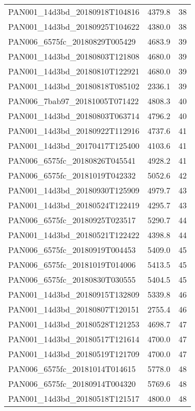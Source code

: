 \begin{tabular}{lrr}
PAN001\_14d3bd\_20180918T104816 &     4379.8 &       38 \\
PAN001\_14d3bd\_20180925T104622 &     4380.0 &       38 \\
PAN006\_6575fc\_20180829T005429 &     4683.9 &       39 \\
PAN001\_14d3bd\_20180803T121808 &     4680.0 &       39 \\
PAN001\_14d3bd\_20180810T122921 &     4680.0 &       39 \\
PAN001\_14d3bd\_20180818T085102 &     2336.1 &       39 \\
PAN006\_7bab97\_20181005T071422 &     4808.3 &       40 \\
PAN001\_14d3bd\_20180803T063714 &     4796.2 &       40 \\
PAN001\_14d3bd\_20180922T112916 &     4737.6 &       41 \\
PAN001\_14d3bd\_20170417T125400 &     4103.6 &       41 \\
PAN006\_6575fc\_20180826T045541 &     4928.2 &       41 \\
PAN006\_6575fc\_20181019T042332 &     5052.6 &       42 \\
PAN001\_14d3bd\_20180930T125909 &     4979.7 &       43 \\
PAN001\_14d3bd\_20180524T122419 &     4295.7 &       43 \\
PAN006\_6575fc\_20180925T023517 &     5290.7 &       44 \\
PAN001\_14d3bd\_20180521T122422 &     4398.8 &       44 \\
PAN006\_6575fc\_20180919T004453 &     5409.0 &       45 \\
PAN006\_6575fc\_20181019T014006 &     5413.5 &       45 \\
PAN006\_6575fc\_20180830T030555 &     5404.5 &       45 \\
PAN001\_14d3bd\_20180915T132809 &     5339.8 &       46 \\
PAN001\_14d3bd\_20180807T120151 &     2755.4 &       46 \\
PAN001\_14d3bd\_20180528T121253 &     4698.7 &       47 \\
PAN001\_14d3bd\_20180517T121614 &     4700.0 &       47 \\
PAN001\_14d3bd\_20180519T121709 &     4700.0 &       47 \\
PAN006\_6575fc\_20181014T014615 &     5778.0 &       48 \\
PAN006\_6575fc\_20180914T004320 &     5769.6 &       48 \\
PAN001\_14d3bd\_20180518T121517 &     4800.0 &       48 \\

\end{tabular}
